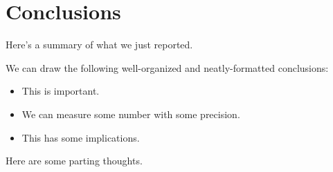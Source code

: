 \documentclass[\docopts]{\docclass}
\begin{document}
\section{Conclusions}
\label{sec:conclusions}

Here's a summary of what we just reported.

We can draw the following well-organized and neatly-formatted conclusions:
\begin{itemize}
  \item This is important.
  \item We can measure some number with some precision.
  \item This has some implications.
\end{itemize}

Here are some parting thoughts.
\end{document}
